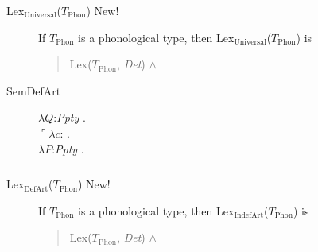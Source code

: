 \begin{description}
  
\item[\textnormal{Lex$_{\mathrm{Universal}}$($T_{\mathrm{Phon}}$)}
        New!]
        \mbox{}

        If $T_{\mathrm{Phon}}$ is a phonological type, then
        Lex$_{\mathrm{Universal}}$($T_{\mathrm{Phon}}$) is
        \begin{quote}
          Lex($T_{\mathrm{Phon}}$, \textit{Det}) \d{$\wedge$}
        \end{quote}

        \item[\textnormal{SemDefArt}] \mbox{}


          $\lambda Q$:\textit{Ppty} . \\
  \hspace*{1em}$\ulcorner\lambda c$: . \\
  \hspace*{2em}$\lambda P$:\textit{Ppty} . \\
  \hspace*{3em}$\urcorner$

        
      \item[\textnormal{Lex$_{\mathrm{DefArt}}$($T_{\mathrm{Phon}}$)} New!]
        \mbox{}

        If $T_{\mathrm{Phon}}$ is a phonological type, then
        Lex$_{\mathrm{IndefArt}}$($T_{\mathrm{Phon}}$) is
        \begin{quote}
          Lex($T_{\mathrm{Phon}}$, \textit{Det}) \d{$\wedge$}
        \end{quote}


\end{description}
